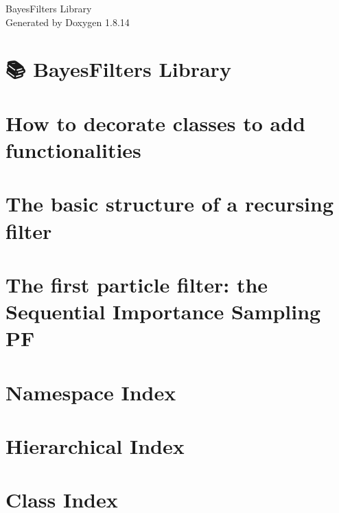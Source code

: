 \documentclass[twoside]{book}
\newcommand{\+}{\discretionary{\mbox{\scriptsize$\hookleftarrow$}}{}{}}
\newcommand{\clearemptydoublepage}{%
  \newpage{\pagestyle{empty}\cleardoublepage}%
}
\begin{document}
\hypersetup{pageanchor=false,
             bookmarksnumbered=true,
             pdfencoding=unicode
            }
\begin{titlepage}
\vspace*{7cm}
\begin{center}%
{\Large Bayes\+Filters Library }\\
\vspace*{1cm}
{\large Generated by Doxygen 1.8.14}\\
\end{center}
\end{titlepage}
\clearemptydoublepage
{}
\tableofcontents
\clearemptydoublepage
{}
\hypersetup{pageanchor=true}

\chapter{📚 Bayes\+Filters Library}
\label{index}\hypertarget{index}{}
\chapter{How to decorate classes to add functionalities}
\label{decorate-classes}

\chapter{The basic structure of a recursing filter}
\label{basic-structure-recursive-filter}

\chapter{The first particle filter\+: the Sequential Importance Sampling PF}
\label{sis-pf}

\chapter{Namespace Index}

\chapter{Hierarchical Index}

\chapter{Class Index}

\end{document}
